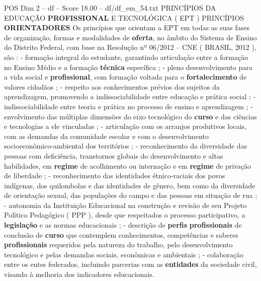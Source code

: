 \begin{textsample}{POS Dim 2 – df – Score 18.00 – df/df\_em\_54.txt}
PRINCÍPIOS DA EDUCAÇÃO \textbf{PROFISSIONAL} E TECNOLÓGICA ( EPT ) PRINCÍPIOS \textbf{ORIENTADORES} Os princípios que orientam a EPT em todas as suas fases de organização, formas e modalidades de \textbf{oferta}, no âmbito do Sistema de Ensino do Distrito Federal, com base na Resolução nº 06/2012 – CNE ( BRASIL, 2012 ), são : - formação integral do estudante, garantindo articulação entre a formação no Ensino Médio e a formação \textbf{técnica} específica ; - pleno desenvolvimento para a vida social e \textbf{profissional}, com formação voltada para o \textbf{fortalecimento} de valores cidadãos ; - respeito aos conhecimentos prévios dos sujeitos da aprendizagem, promovendo a indissociabilidade entre educação e prática social ; - indissociabilidade entre teoria e prática no processo de ensino e aprendizagem ; - envolvimento das múltiplas dimensões do eixo tecnológico do \textbf{curso} e das ciências e tecnologias a ele vinculadas ; - articulação com os arranjos produtivos locais, com as demandas da comunidade escolar e com o desenvolvimento socioeconômico-ambiental dos territórios ; - reconhecimento da diversidade das pessoas com deficiência, transtornos globais do desenvolvimento e altas habilidades, em \textbf{regime} de acolhimento ou internação e em \textbf{regime} de privação de liberdade ; - reconhecimento das identidades étnico-raciais dos povos indígenas, dos quilombolas e das identidades de gênero, bem como da diversidade de orientação sexual, das populações do campo e das pessoas em situação de rua ; - autonomia da Instituição Educacional na construção e revisão de seu Projeto Político Pedagógico ( PPP ), desde que respeitados o processo participativo, a \textbf{legislação} e as normas educacionais ; - descrição de \textbf{perfis} \textbf{profissionais} de conclusão de \textbf{curso} que contemplem conhecimentos, competências e saberes \textbf{profissionais} requeridos pela natureza do trabalho, pelo desenvolvimento tecnológico e pelas demandas sociais, econômicas e ambientais ; - colaboração entre os entes federados, incluindo parcerias com as \textbf{entidades} da sociedade civil, visando à melhoria dos indicadores educacionais.

\end{textsample}
